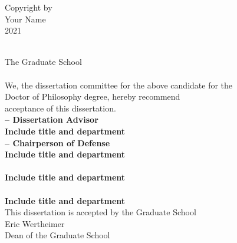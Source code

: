 \documentclass[
12pt, %
oneside, %
english, %
doublespacing, %
liststotoc, %
]{main} %
\begin{document}
\begin{singlespace}

\vspace*{\fill}
\begin{center}
Copyright by\\
Your Name\\
2021\\
\end{center}
\newpage
{}


\setcounter{page}{2}
\begin{center}
	\textbf{\univname}\\[0.5cm]
	The Graduate School\\[2cm]
	\textbf{\authorname}\\[2cm]
	We, the dissertation committee for the above candidate for the \\[0.5cm]
	Doctor of Philosophy degree, hereby recommend \\[0.5cm]
	acceptance of this dissertation. \\[1cm]
	
	\textbf{{\supname} -- Dissertation Advisor\\
	Include title and department}\\ [1cm]
	
	\textbf{{\examinerOname} -- Chairperson of Defense\\
	Include title and department}\\ [1cm]
	
	\textbf{{\examinerThname}\\
	Include title and department}\\ [1cm]
	
	\textbf{{\examinerJrname}\\
	Include title and department}\\ [1cm]
	
	This dissertation is accepted by the Graduate School\\ [2cm]
	Eric Wertheimer\\ [0.5cm]
	Dean of the Graduate School\\ [0.5cm]


\end{center}
\end{singlespace}
\end{document}
